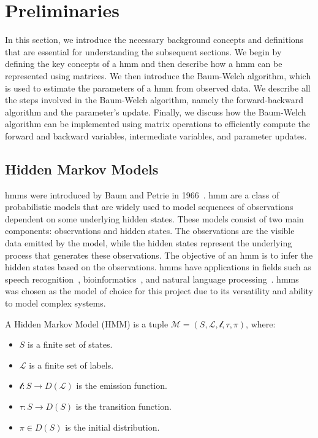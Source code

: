 \section{Preliminaries}\label{sec:preliminaries}
In this section, we introduce the necessary background concepts and definitions that are essential for understanding the subsequent sections.
We begin by defining the key concepts of a \gls{hmm} and then describe how a \gls{hmm} can be represented using matrices.
We then introduce the Baum-Welch algorithm, which is used to estimate the parameters of a \gls{hmm} from observed data.
We describe all the steps involved in the Baum-Welch algorithm, namely the forward-backward algorithm and the parameter's update.
Finally, we discuss how the Baum-Welch algorithm can be implemented using matrix operations to efficiently compute the forward and backward variables, intermediate variables, and parameter updates.

\subsection{Hidden Markov Models}\label{subsec:hmm}
\glspl{hmm} were introduced by Baum and Petrie in 1966~\cite{baum1966statistical}.
\gls{hmm} are a class of probabilistic models that are widely used to model sequences of observations dependent on some underlying hidden states.
These models consist of two main components: observations and hidden states.
The observations are the visible data emitted by the model, while the hidden states represent the underlying process that generates these observations.
The objective of an \gls{hmm} is to infer the hidden states based on the observations.
\glspl{hmm} have applications in fields such as speech recognition~\cite{chavan2013overview}, bioinformatics~\cite{de2007hidden}, and natural language processing~\cite{murveit1990integrating}.
\glspl{hmm} was chosen as the model of choice for this project due to its versatility and ability to model complex systems.

\begin{definition}
    A Hidden Markov Model (HMM) is a tuple $\mathcal{M} = (S, \mathcal{L}, \mathscr{l}, \tau,  \pi)$, where:
    \begin{itemize}
        \item $S$ is a finite set of states.
        \item $\mathcal{L}$ is a finite set of labels.
        \item $\mathscr{l}: S \rightarrow D(\mathcal{L})$ is the emission function.
        \item $\tau: S \rightarrow D(S)$ is the transition function.
        \item $\pi \in D(S)$ is the initial distribution.
    \end{itemize}
\end{definition}

